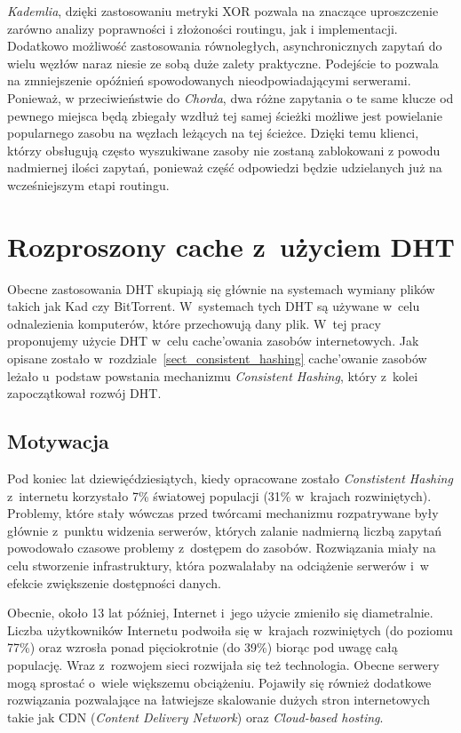\documentclass[a4paper,11pt]{scrartcl}
\newcommand{\s}{ }
\newcommand{\kesz}{cache}
\newcommand{\keszowania}{cache'owania}
\newcommand{\keszowanie}{cache'owanie}
\begin{document}
\textit{Kademlia}, dzięki zastosowaniu metryki XOR pozwala na znaczące uproszczenie zarówno analizy poprawności i złożoności routingu, jak i implementacji. Dodatkowo możliwość zastosowania równoległych, asynchronicznych zapytań do wielu węzłów naraz niesie ze sobą duże zalety praktyczne. Podejście to pozwala na zmniejszenie opóźnień spowodowanych nieodpowiadającymi serwerami. Ponieważ, w przeciwieństwie do \textit{Chorda}, dwa różne zapytania o te same klucze od pewnego miejsca będą zbiegały wzdłuż tej samej ścieżki możliwe jest powielanie popularnego zasobu na węzłach leżących na tej ścieżce. Dzięki temu klienci, którzy obsługują często wyszukiwane zasoby nie zostaną zablokowani z powodu nadmiernej ilości zapytań, ponieważ część odpowiedzi będzie udzielanych już na wcześniejszym etapi routingu.

\section{Rozproszony \kesz\s z~użyciem DHT}
Obecne zastosowania DHT skupiają się głównie na systemach wymiany plików takich jak Kad czy BitTorrent. W~systemach tych DHT są używane w~celu odnalezienia komputerów, które przechowują dany plik. W~tej pracy proponujemy użycie DHT w~celu \keszowania\s zasobów internetowych. Jak opisane zostało w~rozdziale~\ref{sect_consistent_hashing} \keszowanie\s zasobów leżało u~podstaw powstania mechanizmu \textit{Consistent Hashing}, który z~kolei zapoczątkował rozwój DHT.

\subsection{Motywacja}
Pod koniec lat dziewięćdziesiątych, kiedy opracowane zostało \textit{Constistent Hashing} z~internetu korzystało 7\% światowej populacji (31\% w~krajach rozwiniętych)\cite{wiki:GlobalStats}. Problemy, które stały wówczas przed twórcami mechanizmu rozpatrywane były głównie z~punktu widzenia serwerów, których zalanie nadmierną liczbą zapytań powodowało czasowe problemy z~dostępem do zasobów. Rozwiązania miały na celu stworzenie infrastruktury, która pozwalałaby na odciążenie serwerów i~w efekcie zwiększenie dostępności danych.

Obecnie, około 13 lat później, Internet i~jego użycie zmieniło się diametralnie. Liczba użytkowników Internetu podwoiła się w~krajach rozwiniętych (do poziomu 77\%) oraz wzrosła ponad pięciokrotnie (do 39\%) biorąc pod uwagę całą populację\cite{wiki:GlobalStats}. Wraz z~rozwojem sieci rozwijała się też technologia. Obecne serwery mogą sprostać o~wiele większemu obciążeniu. Pojawiły się również dodatkowe rozwiązania pozwalające na łatwiejsze skalowanie dużych stron internetowych takie jak CDN (\textit{Content Delivery Network}) oraz \textit{Cloud-based hosting}.
\end{document}
